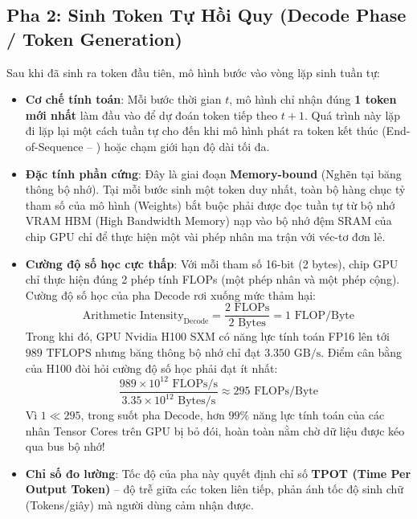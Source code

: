 \subsection{Pha 2: Sinh Token Tự Hồi Quy (Decode Phase / Token Generation)}
Sau khi đã sinh ra token đầu tiên, mô hình bước vào vòng lặp sinh tuần tự:
\begin{itemize}
  \item \textbf{Cơ chế tính toán}: Mỗi bước thời gian $t$, mô hình chỉ nhận đúng \textbf{1 token mới nhất} làm đầu vào để dự đoán token tiếp theo $t+1$. Quá trình này lặp đi lặp lại một cách tuần tự cho đến khi mô hình phát ra token kết thúc (End-of-Sequence -- ) hoặc chạm giới hạn độ dài tối đa.
  \item \textbf{Đặc tính phần cứng}: Đây là giai đoạn \textbf{Memory-bound} (Nghẽn tại băng thông bộ nhớ). Tại mỗi bước sinh một token duy nhất, toàn bộ hàng chục tỷ tham số của mô hình (Weights) bắt buộc phải được đọc tuần tự từ bộ nhớ VRAM HBM (High Bandwidth Memory) nạp vào bộ nhớ đệm SRAM của chip GPU chỉ để thực hiện một vài phép nhân ma trận với véc-tơ đơn lẻ.
  \item \textbf{Cường độ số học cực thấp}: Với mỗi tham số 16-bit (2 bytes), chip GPU chỉ thực hiện đúng 2 phép tính FLOPs (một phép nhân và một phép cộng). Cường độ số học của pha Decode rơi xuống mức thảm hại:
  \begin{equation}
  \text{Arithmetic Intensity}_{\text{Decode}} = \frac{2\text{ FLOPs}}{2\text{ Bytes}} = 1\text{ FLOP/Byte}
  \end{equation}
  Trong khi đó, GPU Nvidia H100 SXM có năng lực tính toán FP16 lên tới $989\text{ TFLOPS}$ nhưng băng thông bộ nhớ chỉ đạt $3.350\text{ GB/s}$. Điểm cân bằng của H100 đòi hỏi cường độ số học phải đạt ít nhất:
  \begin{equation}
  \frac{989 \times 10^{12}\text{ FLOPs/s}}{3.35 \times 10^{12}\text{ Bytes/s}} \approx 295\text{ FLOPs/Byte}
  \end{equation}
  Vì $1 \ll 295$, trong suốt pha Decode, hơn $99\%$ năng lực tính toán của các nhân Tensor Cores trên GPU bị bỏ đói, hoàn toàn nằm chờ dữ liệu được kéo qua bus bộ nhớ!
  \item \textbf{Chỉ số đo lường}: Tốc độ của pha này quyết định chỉ số \textbf{TPOT (Time Per Output Token)} -- độ trễ giữa các token liên tiếp, phản ánh tốc độ sinh chữ (Tokens/giây) mà người dùng cảm nhận được.
\end{itemize}

